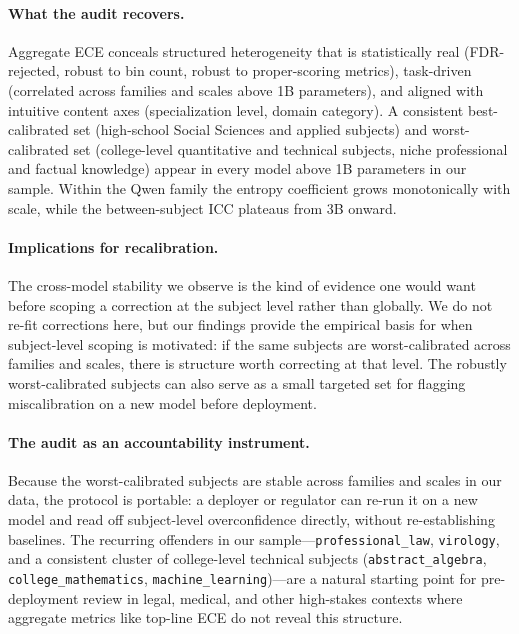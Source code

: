 \documentclass{article}
\begin{document}
\paragraph{What the audit recovers.} Aggregate ECE conceals structured
heterogeneity that is statistically real (FDR-rejected, robust to bin count,
robust to proper-scoring metrics), task-driven (correlated across families
and scales above 1B parameters), and aligned with intuitive content axes
(specialization level, domain category). A consistent best-calibrated set (high-school Social Sciences and applied
subjects) and worst-calibrated set (college-level quantitative and technical
subjects, niche professional and factual knowledge) appear in every model
above 1B parameters in our sample. Within the Qwen
family the entropy coefficient grows monotonically with scale, while the
between-subject ICC plateaus from 3B onward.

\paragraph{Implications for recalibration.} The cross-model stability we
observe is the kind of evidence one would want before scoping a correction at
the subject level rather than globally. We do not re-fit corrections here,
but our findings provide the empirical basis for when subject-level scoping
is motivated: if the same subjects are worst-calibrated across families and
scales, there is structure worth correcting at that level. The robustly
worst-calibrated subjects can also serve as a small targeted set for
flagging miscalibration on a new model before deployment.

\paragraph{The audit as an accountability instrument.}
Because the worst-calibrated subjects are stable across families and scales
in our data, the protocol is portable: a deployer or regulator can re-run
it on a new model and read off subject-level overconfidence directly,
without re-establishing baselines. The recurring offenders in our sample---\texttt{professional\_law},
\texttt{virology}, and a consistent cluster of college-level technical subjects
(\texttt{abstract\_algebra}, \texttt{college\_mathematics},
\texttt{machine\_learning})---are a natural starting point for pre-deployment
review in legal, medical, and other high-stakes contexts where aggregate
metrics like top-line ECE do not reveal this structure.
\end{document}
